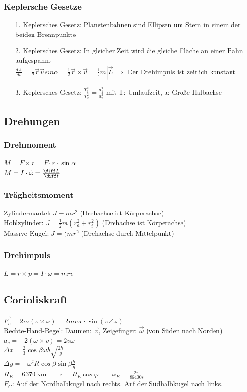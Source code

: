 \documentclass[german]{latex4ei/latex4ei_sheet}
\begin{document}
\subsubsection{Keplersche Gesetze}
\begin{sectionbox}
\begin{itemize}
\item[1.] Keplersches Gesetz: Planetenbahnen sind Ellipsen um Stern in einem der beiden Brennpunkte
\item[2.] Keplersches Gesetz: In gleicher Zeit wird die gleiche Fläche an einer Bahn aufgespannt\\$\frac{dA}{dt} = \frac{1}{2} \vec {r} \vec {v} sin \alpha = \frac{1}{2}\vec {r} \times \vec {v} = \frac{1}{2}m|\vec {L}| \Rightarrow$ Der Drehimpuls ist zeitlich konstant
\item[3.] Keplersches Gesetz: $\frac{T_1^2}{T_2^2} = \frac{a_1^3}{a_2^3}$ mit T: Umlaufzeit, a: Große Halbachse
\end{itemize}
\end{sectionbox}
\subsection{Drehungen}
\subsubsection{Drehmoment}
$M=F\times r=F\cdot r\cdot \sin \alpha$\\
$M=I\cdot \dot{\omega}=\frac{\diff L}{\diff t}$
\subsubsection{Trägheitsmoment}
Zylindermantel: $J = mr^2$ (Drehachse ist Körperachse)\\
Hohlzylinder: $J = \frac{1}{2}m(r_a^2+r_i^2)$ (Drehachse ist Körperachse)\\
Massive Kugel: $J = \frac{2}{5}mr^2$ (Drehachse durch Mittelpunkt)\\
\subsubsection{Drehimpuls}
$L=r\times p=I\cdot \omega = mrv$
\subsection{Corioliskraft}
$\vec{F_c}=2m(v\times \omega)= 2m v w \cdot \sin{(v\angle \omega)}$\\
Rechte-Hand-Regel: Daumen: $\vec{v}$, Zeigefinger: $\vec{\omega}$ (von Süden nach Norden)\\
$a_c=-2(\omega \times v)=2v\omega$\\
$\Delta x= \frac{2}{3}\cos \beta \omega h \sqrt{\frac{2h}{g}}$\\
$\Delta y = -\omega^2R\cos \beta \sin \beta \frac{h}{g}$\\
$R_E=\SI{6370}{\kilo \meter} \qquad r=R_E \cos \varphi \qquad \omega_E=\frac{2\pi}{86400\si{\second}}$\\
$F_C$: Auf der Nordhalbkugel nach rechts. Auf der Südhalbkugel nach links.
\end{document}
